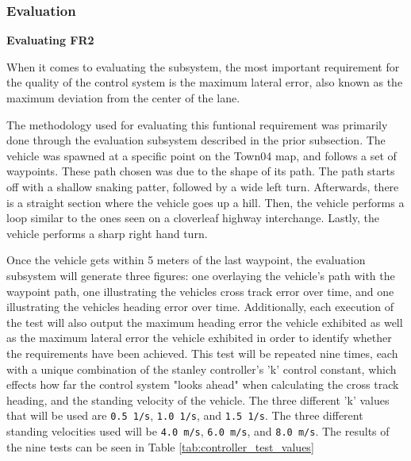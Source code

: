 \documentclass[titlepage]{article}
\begin{document}
{\subsubsection{Evaluation}
\textbf{Evaluating FR2}

When it comes to evaluating the subsystem, the most important requirement for the quality of the control system is the maximum lateral error, also known as the maximum deviation from the center of the lane.

The methodology used for evaluating this funtional requirement was primarily done through the evaluation subsystem described in the prior subsection. The vehicle was spawned at a specific point on the Town04 map, and follows a set of waypoints. These path chosen was due to the shape of its path. The path starts off with a shallow snaking patter, followed by a wide left turn. Afterwards, there is a straight section where the vehicle goes up a hill. Then, the vehicle performs a loop similar to the ones seen on a cloverleaf highway interchange. Lastly, the vehicle performs a sharp right hand turn.

Once the vehicle gets within 5 meters of the last waypoint, the evaluation subsystem will generate three figures: one overlaying the vehicle's path with the waypoint path, one illustrating the vehicles cross track error over time, and one illustrating the vehicles heading error over time. Additionally, each execution of the test will also output the maximum heading error the vehicle exhibited as well as the maximum lateral error the vehicle exhibited in order to identify whether the requirements have been achieved. This test will be repeated nine times, each with a unique combination of the stanley controller's 'k' control constant, which effects how far the control system "looks ahead" when calculating the cross track heading, and the standing velocity of the vehicle. The three different 'k' values that will be used are \texttt{0.5 1/s}, \texttt{1.0 1/s}, and \texttt{1.5 1/s}. The three different standing velocities used will be \texttt{4.0 m/s}, \texttt{6.0 m/s}, and \texttt{8.0 m/s}. The results of the nine tests can be seen in Table \ref{tab:controller_test_values}

}
\end{document}
